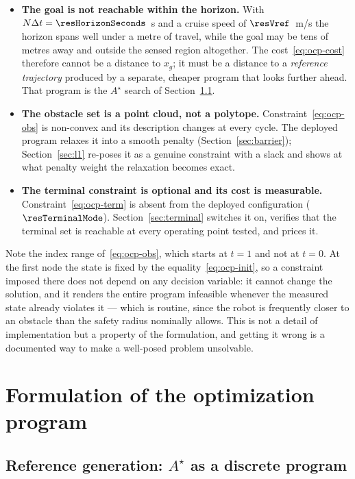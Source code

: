 \documentclass[11pt,a4paper]{article}
\newcommand{\astar}{$A^\star$}
\begin{document}
\begin{itemize}
  \item \textbf{The goal is not reachable within the horizon.} With $N\Delta t=\resHorizonSeconds$~s and a
        cruise speed of $\resVref$~m/s the horizon spans well under a metre of travel, while the goal may be
        tens of metres away and outside the sensed region altogether. The cost~\eqref{eq:ocp-cost} therefore
        cannot be a distance to $x_g$; it must be a distance to a \emph{reference trajectory} produced by a
        separate, cheaper program that looks further ahead. That program is the \astar{} search of
        Section~\ref{sec:astar}.
  \item \textbf{The obstacle set is a point cloud, not a polytope.} Constraint~\eqref{eq:ocp-obs} is
        non-convex and its description changes at every cycle. The deployed program relaxes it into a smooth
        penalty (Section~\ref{sec:barrier}); Section~\ref{sec:l1} re-poses it as a genuine constraint with a
        slack and shows at what penalty weight the relaxation becomes exact.
  \item \textbf{The terminal constraint is optional and its cost is measurable.}
        Constraint~\eqref{eq:ocp-term} is absent from the deployed configuration
        ($\texttt{\resTerminalMode}$). Section~\ref{sec:terminal} switches it on, verifies that the terminal
        set is reachable at every operating point tested, and prices it.
\end{itemize}

Note the index range of~\eqref{eq:ocp-obs}, which starts at $t=1$ and not at $t=0$. At the first node the
state is fixed by the equality~\eqref{eq:ocp-init}, so a constraint imposed there does not depend on any
decision variable: it cannot change the solution, and it renders the entire program infeasible whenever the
measured state already violates it --- which is routine, since the robot is frequently closer to an obstacle
than the safety radius nominally allows. This is not a detail of implementation but a property of the
formulation, and getting it wrong is a documented way to make a well-posed problem unsolvable.

\section{Formulation of the optimization program}
\label{sec:formulation}

\subsection{Reference generation: \texorpdfstring{\astar{}}{A*} as a discrete program}
\label{sec:astar}
\end{document}
